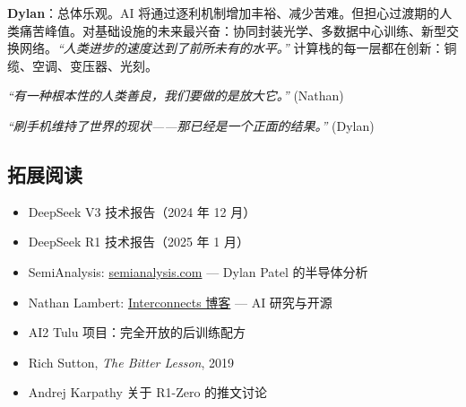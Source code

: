 \textbf{Dylan}：总体乐观。AI 将通过逐利机制增加丰裕、减少苦难。但担心过渡期的人类痛苦峰值。对基础设施的未来最兴奋：协同封装光学、多数据中心训练、新型交换网络。\textit{``人类进步的速度达到了前所未有的水平。''} 计算栈的每一层都在创新：铜缆、空调、变压器、光刻。

\textit{``有一种根本性的人类善良，我们要做的是放大它。''} (Nathan)

\textit{``刷手机维持了世界的现状——那已经是一个正面的结果。''} (Dylan)

\subsection{拓展阅读}

\begin{itemize}
    \item DeepSeek V3 技术报告（2024 年 12 月）
    \item DeepSeek R1 技术报告（2025 年 1 月）
    \item SemiAnalysis: \href{https://semianalysis.com}{semianalysis.com} — Dylan Patel 的半导体分析
    \item Nathan Lambert: \href{https://www.interconnects.ai}{Interconnects 博客} — AI 研究与开源
    \item AI2 Tulu 项目：完全开放的后训练配方
    \item Rich Sutton, \textit{The Bitter Lesson}, 2019
    \item Andrej Karpathy 关于 R1-Zero 的推文讨论
\end{itemize}



